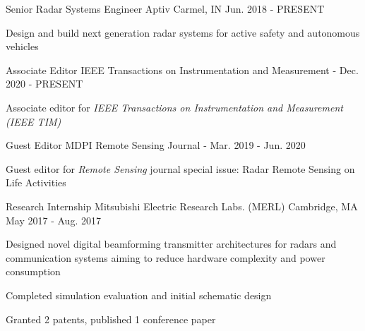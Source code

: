 
\begin{cventries}

    \cventry
        {Senior Radar Systems Engineer}
        {Aptiv}
        {Carmel, IN}
        {Jun. 2018 - PRESENT}
        {
            \begin{cvitems}
                \item {Design and build next generation radar systems for active safety and autonomous vehicles}
            \end{cvitems}
        }
    
    \cventry
        {Associate Editor}
        {IEEE Transactions on Instrumentation and Measurement}
        {-}
        {Dec. 2020 - PRESENT}
        {
            \begin{cvitems}
                \item {Associate editor for \em{IEEE Transactions on Instrumentation and Measurement (IEEE TIM)}}
            \end{cvitems}
        }
        
    \cventry
        {Guest Editor}
        {MDPI Remote Sensing Journal}
        {-}
        {Mar. 2019 - Jun. 2020}
        {
            \begin{cvitems}
                \item {Guest editor for {\em{Remote Sensing}} journal special issue: Radar Remote Sensing on Life Activities}
            \end{cvitems}
        }

    \cventry
        {Research Internship}
        {Mitsubishi Electric Research Labs. (MERL)}
        {Cambridge, MA}
        {May 2017 - Aug. 2017}
        {
            \begin{cvitems}
                \item {Designed novel digital beamforming transmitter architectures for radars and communication systems aiming to reduce hardware complexity and power consumption}
                \item {Completed simulation evaluation and initial schematic design}
                \item {Granted 2 patents, published 1 conference paper}
            \end{cvitems}
        }

\end{cventries}
